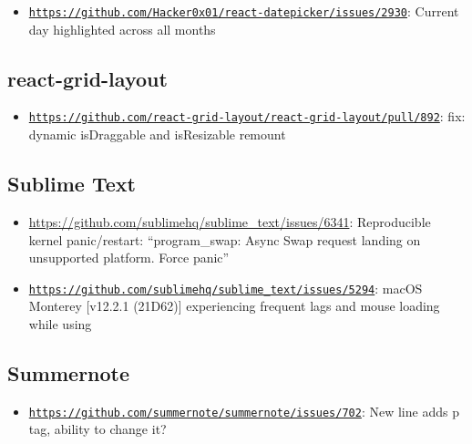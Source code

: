 \documentclass[]{article}
\begin{document}
\begin{itemize}
	\item \href{https://github.com/Hacker0x01/react-datepicker/issues/2930#issuecomment-1068580469}{\texttt{https://github.com/Hacker0x01/react-datepicker/issues/2930}}: Current day highlighted across all months
\end{itemize}

\subsection*{react-grid-layout}

\begin{itemize}
	\item \href{https://github.com/react-grid-layout/react-grid-layout/pull/892#issuecomment-584350480}{\texttt{https://github.com/react-grid-layout/react-grid-layout/pull/892}}: fix: dynamic isDraggable and isResizable remount
\end{itemize}

\subsection*{Sublime Text}

\begin{itemize}
	\item \url{https://github.com/sublimehq/sublime_text/issues/6341}: Reproducible kernel panic/restart: “program\_swap: Async Swap request landing on unsupported platform. Force panic”
	\item \href{https://github.com/sublimehq/sublime_text/issues/5294#issuecomment-1104558780}{\texttt{https://github.com/sublimehq/sublime\_text/issues/5294}}: macOS Monterey [v12.2.1 (21D62)] experiencing frequent lags and mouse loading while using
\end{itemize}

\subsection*{Summernote}

\begin{itemize}
	\item \href{https://github.com/summernote/summernote/issues/702#issuecomment-404166447}{\texttt{https://github.com/summernote/summernote/issues/702}}: New line adds p tag, ability to change it?
\end{itemize}
\end{document}
